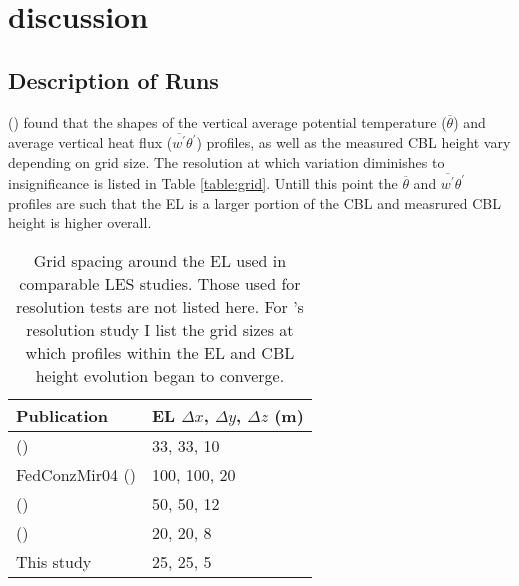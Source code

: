 
\chapter{discussion}
\label{ch:results}
\setlength{\parindent}{0cm}

\section{Description of Runs}
\FloatBarrier

\citeauthor{SullPat} (\citeyear{SullPat}) found that the shapes of the vertical average potential temperature ($\overline{\theta}$) and average vertical heat flux ($\overline{w^{'}}\theta^{'}$) profiles, as well as the measured \acs{CBL} height vary depending on grid size.  The resolution at which variation diminishes to insignificance is listed in Table \ref{table:grid}.  Untill this point the $\overline{\theta}$ and $\overline{w^{'}}\theta^{'}$ profiles are such that the \acs{EL} is a larger portion of the \acs{CBL} and measrured \acs{CBL} height is higher overall.\\


\begin{table}[htbp]
    \begin{center}
    \begin{tabular}{ p{4cm} p{2cm}}
Publication & \acs{EL} $\Delta x$, $\Delta y$, $\Delta z$ (m)\\ \hline
      \citeauthor{SullMoengStev} (\citeyear{SullMoengStev}) & 33, 33, 10&  \\ \hline 
      {FedConzMir04} (\citeyear{FedConzMir04}) & 100, 100, 20  &  \\ [.3cm] %
      \citeauthor{BrooksFowler2} (\citeyear{BrooksFowler2}) & 50, 50, 12\\ \hline
    \citeauthor{SullPat} (\citeyear{SullPat}) &  20, 20, 8&  \\ \hline
    This study & 25, 25, 5\\ \hline 
      
    \end{tabular}
\caption[]{Grid spacing around the \acs{EL} used in comparable \acs{LES} studies. Those used for resolution tests are not listed here.  For \citeauthor{SullPat}'s \citeyear{SullPat} resolution study I list the grid sizes at which profiles within the \acs{EL} and \acs{CBL} height evolution began to converge.}
\label{table:gridcomp}   
\end{center}    
\end{table}

